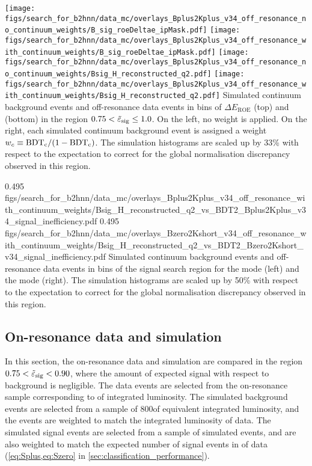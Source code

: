 {
\texttt{[image: figs/search\_for\_b2hnn/data\_mc/overlays\_Bplus2Kplus\_v34\_off\_resonance\_no\_continuum\_weights/B\_sig\_roeDeltae\_ipMask.pdf]}
\texttt{[image: figs/search\_for\_b2hnn/data\_mc/overlays\_Bplus2Kplus\_v34\_off\_resonance\_with\_continuum\_weights/B\_sig\_roeDeltae\_ipMask.pdf]}
\texttt{[image: figs/search\_for\_b2hnn/data\_mc/overlays\_Bplus2Kplus\_v34\_off\_resonance\_no\_continuum\_weights/Bsig\_H\_reconstructed\_q2.pdf]}
\texttt{[image: figs/search\_for\_b2hnn/data\_mc/overlays\_Bplus2Kplus\_v34\_off\_resonance\_with\_continuum\_weights/Bsig\_H\_reconstructed\_q2.pdf]}
}
{
Simulated continuum background events and off-resonance data events in bins of $\Delta E_{\mathrm{ROE}}$ (top) and \qrec (bottom) in the region $0.75<\tilde{\varepsilon}_{\mathrm{sig}}\le1.0$.
On the left, no weight is applied.
On the right, each simulated continuum background event is assigned a weight $w_c\equiv\mathrm{BDT_c}/(1-\mathrm{BDT_c})$.
The simulation histograms are scaled up by 33\% with respect to the expectation to correct for the global normalisation discrepancy observed in this region.
}

{0.495}
{figs/search_for_b2hnn/data_mc/overlays_Bplus2Kplus_v34_off_resonance_with_continuum_weights/Bsig_H_reconstructed_q2_vs_BDT2_Bplus2Kplus_v34_signal_inefficiency.pdf}
{0.495}
{figs/search_for_b2hnn/data_mc/overlays_Bzero2Kshort_v34_off_resonance_with_continuum_weights/Bsig_H_reconstructed_q2_vs_BDT2_Bzero2Kshort_v34_signal_inefficiency.pdf}
{
Simulated continuum background events and off-resonance data events in bins of the signal search region for the \BKpnn mode (left) and the \BKznn mode (right).
The simulation histograms are scaled up by 50\% with respect to the expectation to correct for the global normalisation discrepancy observed in this region.
\ssrtext
}
\subsection{On-resonance data and simulation} \label{sec:sideband}
In this section, the on-resonance data and simulation are compared in the region $0.75<\tilde{\varepsilon}_{\mathrm{sig}}<0.90$, where the amount of expected signal with respect to background is negligible.
The data events are selected from the on-resonance sample corresponding to \lumion of integrated luminosity.
The simulated background events are selected from a sample of 800\invfb of equivalent integrated luminosity, and the events are weighted to match the integrated luminosity of data.
The simulated signal events are selected from a sample of \nsignalmctest simulated \BKnn events, and are also weighted to match the expected number of signal events in \lumion of data (\cref{eq:Splus,eq:Szero} in \cref{sec:classification_performance}).

